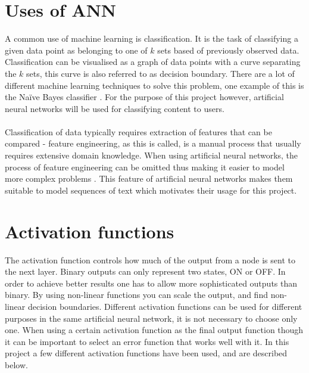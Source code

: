 \section{Uses of ANN}
A common use of machine learning is classification. It is the task of classifying a given data point as belonging to one of $k$ sets based of previously observed data. Classification can be visualised as a graph of data points with a curve separating the $k$ sets, this curve is also referred to as decision boundary. There are a lot of different machine learning techniques to solve this problem, one example of this is the Naïve Bayes classifier \parencite{rish2001empirical}. For the purpose of this project however, artificial neural networks will be used for classifying content to users.
\\\\
Classification of data typically requires extraction of features that can be compared - feature engineering, as this is called, is a manual process that usually requires extensive domain knowledge. When using artificial neural networks, the process of feature engineering can be omitted  thus making it easier to model more complex problems \parencite{nlp2011ronan}. This feature of artificial neural networks makes them suitable to model sequences of text which motivates their usage for this project.


\section{Activation functions}\label{activationfunction}
The activation function controls how much of the output from a node is sent to the next layer. Binary outputs can only represent two states, ON or OFF. In order to achieve better results one has to allow more sophisticated outputs than binary. By using non-linear functions you can scale the output, and find non-linear decision boundaries. Different activation functions can be used for different purposes in the same artificial neural network, it is not necessary to choose only one. When using a certain activation function as the final output function though it can be important to select an error function that works well with it. In this project a few different activation functions have been used, and are described below.

